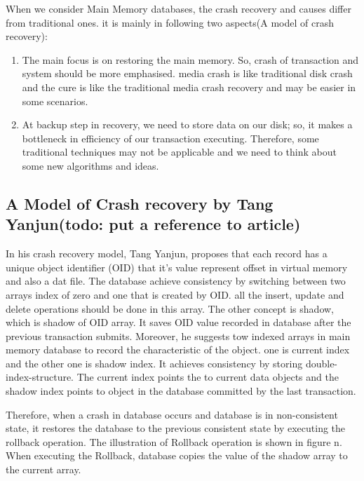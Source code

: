\documentclass[10pt]{article} %
\begin{document}
When we consider Main Memory databases, the crash recovery and causes differ from traditional ones. it is mainly in following two aspects(A model of crash recovery):

\begin{enumerate}

  \item The main focus is on restoring the main memory. So, crash of transaction and system should be more emphasised. media crash is like traditional disk crash and the cure is like the traditional media crash recovery and may be easier in some scenarios.
  \item At backup step in recovery, we need to store data on our disk; so, it makes a bottleneck in efficiency of our transaction executing. Therefore, some traditional techniques may not be applicable and we need to think about some new algorithms and ideas.

\end{enumerate}


\subsection{A Model of Crash recovery by Tang Yanjun(todo: put a reference to article)}

In his crash recovery model, Tang Yanjun, proposes that each record has a unique object identifier (OID) that it’s value represent offset in virtual memory and also a dat file. The database achieve consistency by switching between two arrays index of zero and one that is created by OID. all the insert, update and delete operations should be done in this array. The other concept is shadow, which is shadow of OID array. It saves OID value recorded in database after the previous transaction submits. Moreover, he suggests tow indexed arrays in main memory database to record the characteristic of the object. one is current index and the other one is shadow index. It achieves consistency by storing double-index-structure. The current index points the to current data objects and the shadow index points to object in the database committed by the last transaction.

Therefore, when a crash in database occurs and database is in non-consistent state, it restores the database to the previous consistent state by executing the rollback operation. The illustration of Rollback operation is shown in figure n. When executing the Rollback, database copies the value of the shadow array to the current array.
\end{document}
